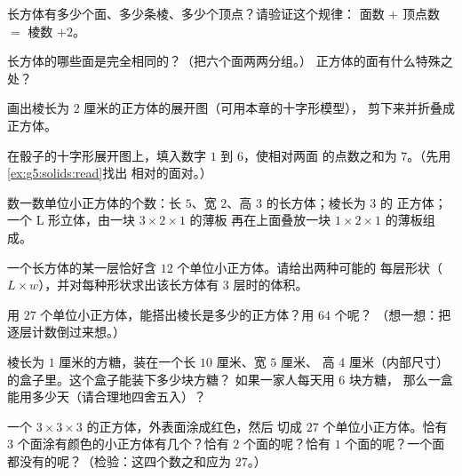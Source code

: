 \begin{exercise}[$\star$]\label{exo:g5:solids:2}
长方体有多少个面、多少条棱、多少个顶点？请验证这个规律：
面数 $+$ 顶点数 $=$ 棱数 $+ 2$。
\end{exercise}

\begin{exercise}[$\star$]\label{exo:g5:solids:3}
长方体的哪些面是完全相同的？（把六个面两两分组。）
正方体的面有什么特殊之处？
\end{exercise}

\begin{exercise}[$\star$]\label{exo:g5:solids:4}
画出棱长为 $2$ 厘米的正方体的展开图（可用本章的十字形模型），
剪下来并折叠成正方体。
\end{exercise}

\begin{exercise}[$\star$]\label{exo:g5:solids:5}
在骰子的十字形展开图上，填入数字 $1$ 到 $6$，使相对两面
的点数之和为 $7$。（先用\cref{ex:g5:solids:read}找出
相对的面对。）
\end{exercise}

\begin{exercise}[$\star$]\label{exo:g5:solids:6}
数一数单位小正方体的个数：长 $5$、宽 $2$、高 $3$ 的长方体；棱长为 $3$ 的
正方体；一个 L 形立体，由一块 $3 \times 2 \times 1$ 的薄板
再在上面叠放一块 $1 \times 2 \times 1$ 的薄板组成。
\end{exercise}

\begin{exercise}[$\star$]\label{exo:g5:solids:7}
一个长方体的某一层恰好含 $12$ 个单位小正方体。请给出两种可能的
每层形状（$L \times w$），并对每种形状求出该长方体有
$3$ 层时的体积。
\end{exercise}

\begin{exercise}[$\star$]\label{exo:g5:solids:8}
用 $27$ 个单位小正方体，能搭出棱长是多少的正方体？用 $64$ 个呢？
（想一想：把逐层计数倒过来想。）
\end{exercise}

\begin{exercise}[$\star\star$]\label{exo:g5:solids:9}
棱长为 $1$ 厘米的方糖，装在一个长 $10$ 厘米、宽 $5$ 厘米、
高 $4$ 厘米（内部尺寸）的盒子里。这个盒子能装下多少块方糖？
如果一家人每天用 $6$ 块方糖，
那么一盒能用多少天（请合理地四舍五入）？
\end{exercise}

\begin{exercise}[$\star\star$]\label{exo:g5:solids:10}
一个 $3 \times 3 \times 3$ 的正方体，外表面涂成红色，然后
切成 $27$ 个单位小正方体。恰有
$3$ 个面涂有颜色的小正方体有几个？恰有 $2$ 个面的呢？恰有 $1$ 个面的呢？一个面都没有的呢？（检验：这四个数之和应为
$27$。）
\end{exercise}
